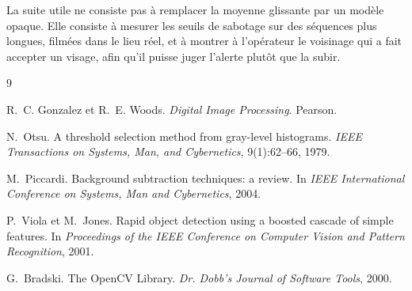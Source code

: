 La suite utile ne consiste pas à remplacer la moyenne glissante par un modèle opaque. Elle consiste à mesurer les seuils de sabotage sur des séquences plus longues, filmées dans le lieu réel, et à montrer à l'opérateur le voisinage qui a fait accepter un visage, afin qu'il puisse juger l'alerte plutôt que la subir.

\begin{thebibliography}{9}

R.~C. Gonzalez et R.~E. Woods.
\newblock \emph{Digital Image Processing}.
\newblock Pearson.

N.~Otsu.
\newblock A threshold selection method from gray-level histograms.
\newblock \emph{IEEE Transactions on Systems, Man, and Cybernetics}, 9(1):62--66, 1979.

M.~Piccardi.
\newblock Background subtraction techniques: a review.
\newblock In \emph{IEEE International Conference on Systems, Man and Cybernetics}, 2004.

P.~Viola et M.~Jones.
\newblock Rapid object detection using a boosted cascade of simple features.
\newblock In \emph{Proceedings of the IEEE Conference on Computer Vision and Pattern Recognition}, 2001.

G.~Bradski.
\newblock The OpenCV Library.
\newblock \emph{Dr. Dobb's Journal of Software Tools}, 2000.

\end{thebibliography}


